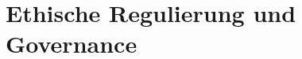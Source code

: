 \section{Ethische Regulierung und Governance}
\label{sec:governance}


\label{subsec:status_quo}


\label{subsubsec:therapy_vs_enhancement}

\label{subsubsec:consumer_diys}

\label{subsubsec:intl_differences}

